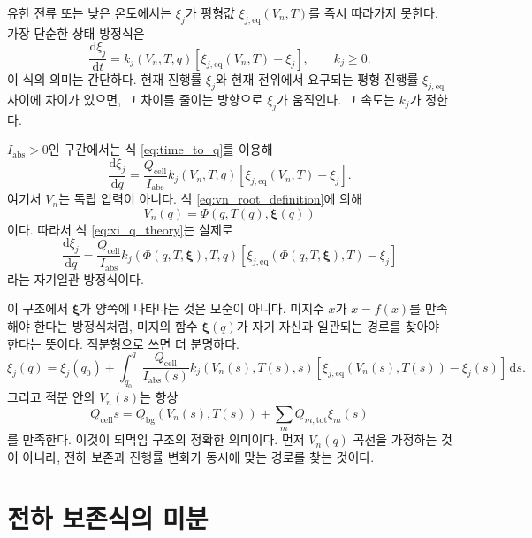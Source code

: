 \documentclass[11pt,a4paper]{article}
\newcommand{\dd}{\mathrm{d}}
\newcommand{\cell}{\mathrm{cell}}
\newcommand{\bg}{\mathrm{bg}}
\newcommand{\tot}{\mathrm{tot}}
\newcommand{\eqs}{\mathrm{eq}}
\newcommand{\absI}{I_{\mathrm{abs}}}
\begin{document}
유한 전류 또는 낮은 온도에서는 \(\xi_j\)가 평형값 \(\xi_{j,\eqs}(V_n,T)\)를 즉시 따라가지 못한다. 가장 단순한 상태 방정식은
\begin{equation}
\frac{\dd \xi_j}{\dd t}
=
k_j(V_n,T,q)
\left[
\xi_{j,\eqs}(V_n,T)-\xi_j
\right],
\qquad
k_j\ge 0.
\label{eq:xi_time_theory}
\end{equation}
이 식의 의미는 간단하다. 현재 진행률 \(\xi_j\)와 현재 전위에서 요구되는 평형 진행률 \(\xi_{j,\eqs}\) 사이에 차이가 있으면, 그 차이를 줄이는 방향으로 \(\xi_j\)가 움직인다. 그 속도는 \(k_j\)가 정한다.

\(\absI>0\)인 구간에서는 식 \eqref{eq:time_to_q}를 이용해
\begin{equation}
\frac{\dd \xi_j}{\dd q}
=
\frac{Q_{\cell}}{\absI}
k_j(V_n,T,q)
\left[
\xi_{j,\eqs}(V_n,T)-\xi_j
\right].
\label{eq:xi_q_theory}
\end{equation}
여기서 \(V_n\)는 독립 입력이 아니다. 식 \eqref{eq:vn_root_definition}에 의해
\begin{equation}
V_n(q)=\Phi(q,T(q),\bm{\xi}(q))
\label{eq:vn_phi_path}
\end{equation}
이다. 따라서 식 \eqref{eq:xi_q_theory}는 실제로
\begin{equation}
\frac{\dd \xi_j}{\dd q}
=
\frac{Q_{\cell}}{\absI}
k_j(\Phi(q,T,\bm{\xi}),T,q)
\left[
\xi_{j,\eqs}(\Phi(q,T,\bm{\xi}),T)-\xi_j
\right]
\label{eq:xi_q_closed}
\end{equation}
라는 자기일관 방정식이다.

이 구조에서 \(\bm{\xi}\)가 양쪽에 나타나는 것은 모순이 아니다. 미지수 \(x\)가 \(x=f(x)\)를 만족해야 한다는 방정식처럼, 미지의 함수 \(\bm{\xi}(q)\)가 자기 자신과 일관되는 경로를 찾아야 한다는 뜻이다. 적분형으로 쓰면 더 분명하다.
\begin{equation}
\xi_j(q)
=
\xi_j(q_0)
+
\int_{q_0}^{q}
\frac{Q_{\cell}}{\absI(s)}
k_j(V_n(s),T(s),s)
\left[
\xi_{j,\eqs}(V_n(s),T(s))-\xi_j(s)
\right]
\,\dd s.
\label{eq:xi_integral_theory}
\end{equation}
그리고 적분 안의 \(V_n(s)\)는 항상
\begin{equation}
Q_{\cell}s
=
Q_{\bg}(V_n(s),T(s))
+\sum_m Q_{m,\tot}\xi_m(s)
\label{eq:vn_inside_integral}
\end{equation}
를 만족한다. 이것이 되먹임 구조의 정확한 의미이다. 먼저 \(V_n(q)\) 곡선을 가정하는 것이 아니라, 전하 보존과 진행률 변화가 동시에 맞는 경로를 찾는 것이다.

\section{전하 보존식의 미분}
\end{document}
